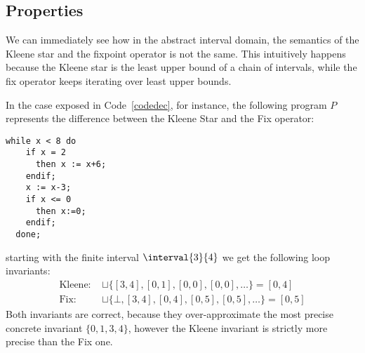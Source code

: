 \subsection{Properties}\label{sub:intervalsprop}

We can immediately see how in the abstract interval domain, the
semantics of the Kleene star and the fixpoint operator is not the
same. This intuitively happens because the Kleene star is the least
upper bound of a chain of intervals, while the fix operator keeps
iterating over least upper bounds.

\begin{example}\label{ex:fix} In the case exposed in
  Code~\ref{codedec}, for instance, the following program \(P\)
  represents the difference between the Kleene Star and the Fix
  operator:
  \begin{lstlisting}[caption=\(\fix{\com}\) and \(\com^*\) difference, label=codedec, language=Imp]
  while x < 8 do
    if x = 2
      then x := x+6;
    endif;
    x := x-3;
    if x <= 0
      then x:=0;
    endif;
  done;\end{lstlisting}
  starting with the finite interval \(\interval{3}{4}\) we get the
  following loop invariants:
  \begin{align*}
    \text{Kleene: } &\sqcup\{[3,4], [0,1], [0,0], [0,0], \ldots\} = [0,4]\\
    \text{Fix: } & \sqcup\{\bot, [3,4], [0,4], [0,5], [0,5],\ldots\} = [0,5]
  \end{align*}
  \noindent
  Both invariants are correct, because they over-approximate the most
  precise concrete invariant \(\{0,1,3,4\}\), however the Kleene
  invariant is strictly more precise than the Fix one.
\end{example}


